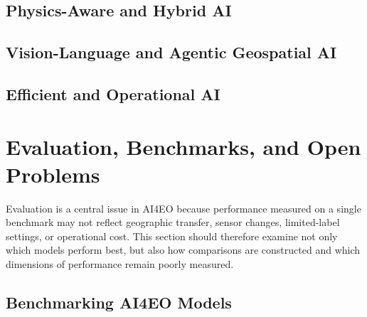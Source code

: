 \documentclass[11pt,a4paper]{article}
\begin{document}
\subsection{Physics-Aware and Hybrid AI}


\subsection{Vision-Language and Agentic Geospatial AI}


\subsection{Efficient and Operational AI}


\section{Evaluation, Benchmarks, and Open Problems}

Evaluation is a central issue in AI4EO because performance measured on a
single benchmark may not reflect geographic transfer, sensor changes,
limited-label settings, or operational cost. This section should
therefore examine not only which models perform best, but also how
comparisons are constructed and which dimensions of performance remain
poorly measured.

\subsection{Benchmarking AI4EO Models}

\end{document}
